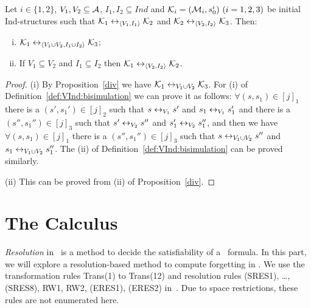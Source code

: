 \documentclass{article}
\begin{document}
\begin{proposition}\label{pro:VI:div}
Let $i\in \{1,2\}$, $V_1,V_2\subseteq\cal A$, $I_1, I_2 \subseteq Ind$
and ${\cal K}_i=({\cal M}_i,s_0^i)~(i=1,2,3)$ be initial Ind-structures
 such that
${\cal K}_1\leftrightarrow_{{\langle{V_1, I_1}\rangle}}{\cal K}_2$ and ${\cal K}_2\leftrightarrow_{{\langle{V_2,I_2}\rangle}}{\cal K}_3$.
 Then:
 \begin{enumerate}[(i)]
   \item ${\cal K}_1\leftrightarrow_{{\langle{V_1\cup V_2, I_1 \cup I_2}\rangle}}{\cal K}_3$;
   \item If $V_1 \subseteq V_2$ and $I_1 \subseteq I_2$ then ${\cal K}_1 \leftrightarrow_{{\langle{V_2, I_2}\rangle}} {\cal K}_2$.
 \end{enumerate}
\end{proposition}
\begin{proof}
(i) By Proposition~\ref{div} we have ${\cal K}_1\leftrightarrow_{V_1\cup V_2}{\cal K}_3$. For (i) of Definition~\ref{def:VInd:bisimulation} we can prove it as follows:
$\forall (s,s_1) \in [j]_1$ there is a $(s', s_1') \in [j]_2$ such that $s\leftrightarrow_{V_1} s'$ and $s_1 \leftrightarrow_{V_1} s_1'$ and there is a $(s'', s_1'') \in [j]_3$ such that $s'\leftrightarrow_{V_2} s''$ and $s_1' \leftrightarrow_{V_2} s_1''$, and then we have $\forall (s,s_1) \in [j]_1$ there is a $(s'', s_1'') \in [j]_3$ such that $s  \leftrightarrow_{V_1\cup V_2} s''$ and $s_1 \leftrightarrow_{V_1\cup V_2} s_1''$. The (ii) of Definition~\ref{def:VInd:bisimulation} can be proved similarly.

(ii) This can be proved from (ii) of Proposition~\ref{div}.
\end{proof}



\section{The Calculus}
\emph{Resolution} in \CTL\ is a method to decide the satisfiability of a \CTL\ formula.
In this part, we will explore a resolution-based method to compute forgetting in \CTL.
We use the transformation rules Trans(1) to Trans(12) and resolution rules (SRES1), \dots, (SRES8), RW1, RW2, (ERES1), (ERES2) in~\cite{zhang2009refined}. Due to space restrictions, these rules are not enumerated here.
\end{document}
